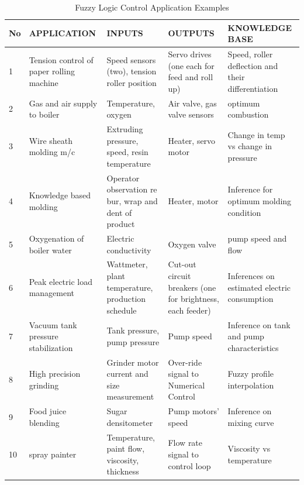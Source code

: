 \documentclass{article}
\begin{document}
\begin{center}
\begin{table}[H]
\caption{Fuzzy Logic Control Application Examples}
\begin{tabular}{| p{.5cm}| p{2cm} | p{2cm} | p{2cm}  |  p{3cm} |}

\hline
  No & APPLICATION & INPUTS & OUTPUTS  &KNOWLEDGE BASE \\
\hline
  1 
  & Tension control of paper rolling machine 
  & Speed sensors (two), tension roller position 
  & Servo drives (one each for feed and roll up)
  & Speed, roller deflection and their differentiation
  \\
\hline
  2 
  & Gas and air supply to boiler 
  & Temperature, oxygen  
  & Air valve, gas valve sensors 
  & optimum combustion
  \\
  \hline
  3 
  & Wire sheath molding m/c 
  & Extruding pressure, speed, resin temperature 
  & Heater, servo motor 
  & Change in temp vs change in pressure
  \\
  \hline
  4
  & Knowledge based molding 
  & Operator  observation re bur, wrap and dent of product   
  & Heater, motor  
  & Inference for optimum molding condition 
  \\
  \hline
  5 
  & Oxygenation of boiler water 
  & Electric conductivity  
  & Oxygen valve
  & pump speed and flow
  \\
  \hline
  6 
  & Peak electric load management  
  & Wattmeter, plant temperature, production schedule 
  & Cut-out circuit breakers (one for brightness, each feeder)  
  & Inferences on estimated electric consumption 
  \\
  \hline
  7 
  & Vacuum tank pressure  stabilization  
  & Tank pressure, pump pressure 
  & Pump speed 
  & Inference on tank and pump characteristics
  \\
  \hline
  8 
  & High precision grinding  
  & Grinder motor current and size measurement 
  & Over-ride signal to Numerical Control 
  & Fuzzy profile interpolation 
  \\
  \hline
  9
  & Food juice blending 
  & Sugar densitometer 
  & Pump motors' speed 
  & Inference on mixing curve
  \\
  \hline            
  10 
  & spray painter  
  & Temperature, paint flow, viscosity, thickness 
  & Flow rate signal to control loop 
  & Viscosity vs temperature
  \\
  \hline            
\end{tabular}
\label{table_Fuzzy_Logic_Control_Application_Examples}
\end{table}
\end{center}
\end{document}
